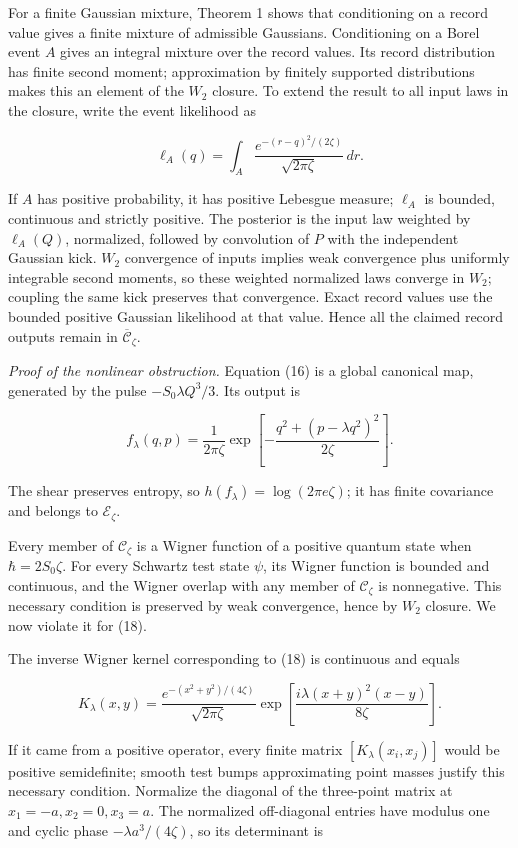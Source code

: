 \documentclass[11pt,a4paper]{article}
\begin{document}
For a finite Gaussian mixture, Theorem 1 shows that conditioning on a
record value gives a finite mixture of admissible Gaussians.
Conditioning on a Borel event \(A\) gives an integral mixture over the
record values. Its record distribution has finite second moment;
approximation by finitely supported distributions makes this an element
of the \(W_2\) closure. To extend the result to all input laws in the
closure, write the event likelihood as

\[
 \ell_A(q)=\int_A\frac{e^{-(r-q)^2/(2\zeta)}}{\sqrt{2\pi\zeta}}\,dr.
 \tag{17}
\]

If \(A\) has positive probability, it has positive Lebesgue measure;
\(\ell_A\) is bounded, continuous and strictly positive. The posterior
is the input law weighted by \(\ell_A(Q)\), normalized, followed by
convolution of \(P\) with the independent Gaussian kick. \(W_2\)
convergence of inputs implies weak convergence plus uniformly integrable
second moments, so these weighted normalized laws converge in \(W_2\);
coupling the same kick preserves that convergence. Exact record values
use the bounded positive Gaussian likelihood at that value. Hence all
the claimed record outputs remain in \(\overline{\mathcal C}_\zeta\).

\emph{Proof of the nonlinear obstruction.} Equation (16) is a global
canonical map, generated by the pulse \(-S_0\lambda Q^3/3\). Its output
is

\[
 f_\lambda(q,p)=\frac{1}{2\pi\zeta}
 \exp\!\left[-\frac{q^2+(p-\lambda q^2)^2}{2\zeta}\right]. \tag{18}
\]

The shear preserves entropy, so \(h(f_\lambda)=\log(2\pi e\zeta)\); it
has finite covariance and belongs to \(\mathcal E_\zeta\).

Every member of \(\mathcal C_\zeta\) is a Wigner function of a positive
quantum state when \(\hbar=2S_0\zeta\). For every Schwartz test state
\(\psi\), its Wigner function is bounded and continuous, and the Wigner
overlap with any member of \(\mathcal C_\zeta\) is nonnegative. This
necessary condition is preserved by weak convergence, hence by \(W_2\)
closure. We now violate it for (18).

The inverse Wigner kernel corresponding to (18) is continuous and equals

\[
 K_\lambda(x,y)=\frac{e^{-(x^2+y^2)/(4\zeta)}}{\sqrt{2\pi\zeta}}
 \exp\!\left[\frac{i\lambda(x+y)^2(x-y)}{8\zeta}\right]. \tag{19}
\]

If it came from a positive operator, every finite matrix
\([K_\lambda(x_i,x_j)]\) would be positive semidefinite; smooth test
bumps approximating point masses justify this necessary condition.
Normalize the diagonal of the three-point matrix at
\(x_1=-a,x_2=0,x_3=a\). The normalized off-diagonal entries have modulus
one and cyclic phase \(-\lambda a^3/(4\zeta)\), so its determinant is
\end{document}
